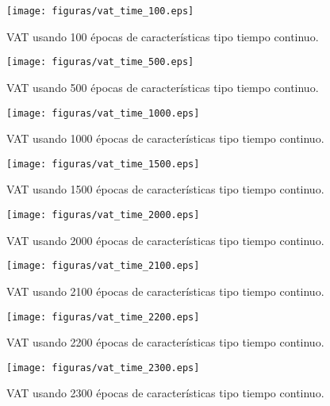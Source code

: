 \begin{figure}[H]
	\centering
	\texttt{[image: figuras/vat\_time\_100.eps]}
	\caption{VAT usando 100 épocas de características tipo tiempo continuo.}
	\label{vat: vat_time_100}
\end{figure}
\begin{figure}[H]
	\centering
	\texttt{[image: figuras/vat\_time\_500.eps]}
	\caption{VAT usando 500 épocas de características tipo tiempo continuo.}
	\label{vat: vat_time_500}
\end{figure}
\begin{figure}[H]
	\centering
	\texttt{[image: figuras/vat\_time\_1000.eps]}
	\caption{VAT usando 1000 épocas de características tipo tiempo continuo.}
	\label{vat: vat_time_1000}
\end{figure}
\begin{figure}[H]
	\centering
	\texttt{[image: figuras/vat\_time\_1500.eps]}
	\caption{VAT usando 1500 épocas de características tipo tiempo continuo.}
	\label{vat: vat_time_1500}
\end{figure}
\begin{figure}[H]
	\centering
	\texttt{[image: figuras/vat\_time\_2000.eps]}
	\caption{VAT usando 2000 épocas de características tipo tiempo continuo.}
	\label{vat: vat_time_2000}
\end{figure}
\begin{figure}[H]
	\centering
	\texttt{[image: figuras/vat\_time\_2100.eps]}
	\caption{VAT usando 2100 épocas de características tipo tiempo continuo.}
	\label{vat: vat_time_2100}
\end{figure}
\begin{figure}[H]
	\centering
	\texttt{[image: figuras/vat\_time\_2200.eps]}
	\caption{VAT usando 2200 épocas de características tipo tiempo continuo.}
	\label{vat: vat_time_2200}
\end{figure}
\begin{figure}[H]
	\centering
	\texttt{[image: figuras/vat\_time\_2300.eps]}
	\caption{VAT usando 2300 épocas de características tipo tiempo continuo.}
	\label{vat: vat_time_2300}
\end{figure}


